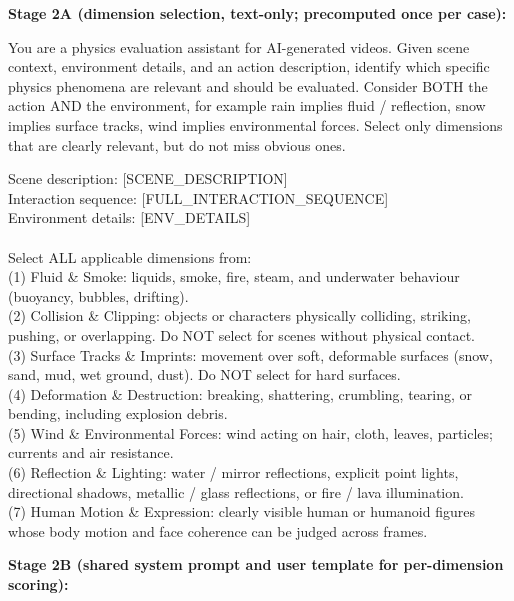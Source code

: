 \begin{tcolorbox}[d5box, title={Causal Fidelity --- Track 2: Scene-Aware Physics Dimensions (0--3, averaged)}]
\textbf{Stage 2A (dimension selection, text-only; precomputed once per case):}
\begin{tcolorbox}[systemprompt]
You are a physics evaluation assistant for AI-generated videos. Given scene context, environment details, and an action description, identify which specific physics phenomena are relevant and should be evaluated. Consider BOTH the action AND the environment, for example rain implies fluid / reflection, snow implies surface tracks, wind implies environmental forces. Select only dimensions that are clearly relevant, but do not miss obvious ones.
\end{tcolorbox}
\vspace{4pt}
\begin{tcolorbox}[userprompt]
Scene description: [SCENE\_DESCRIPTION]\\
Interaction sequence: [FULL\_INTERACTION\_SEQUENCE]\\
Environment details: [ENV\_DETAILS]\\
\\
Select ALL applicable dimensions from:\\
(1) Fluid \& Smoke: liquids, smoke, fire, steam, and underwater behaviour (buoyancy, bubbles, drifting).\\
(2) Collision \& Clipping: objects or characters physically colliding, striking, pushing, or overlapping. Do NOT select for scenes without physical contact.\\
(3) Surface Tracks \& Imprints: movement over soft, deformable surfaces (snow, sand, mud, wet ground, dust). Do NOT select for hard surfaces.\\
(4) Deformation \& Destruction: breaking, shattering, crumbling, tearing, or bending, including explosion debris.\\
(5) Wind \& Environmental Forces: wind acting on hair, cloth, leaves, particles; currents and air resistance.\\
(6) Reflection \& Lighting: water / mirror reflections, explicit point lights, directional shadows, metallic / glass reflections, or fire / lava illumination.\\
(7) Human Motion \& Expression: clearly visible human or humanoid figures whose body motion and face coherence can be judged across frames.
\end{tcolorbox}
\vspace{6pt}
\textbf{Stage 2B (shared system prompt and user template for per-dimension scoring):}

\end{tcolorbox}
